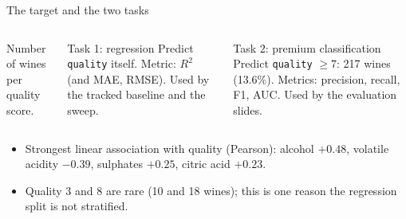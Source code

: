 \begin{frame}{The target and the two tasks}
\begin{columns}[T]
\centering
{}

{\scriptsize Number of wines per quality score.\par}
\begin{block}{Task 1: regression}
\footnotesize Predict \texttt{quality} itself. Metric: $R^2$ (and MAE, RMSE). Used by the tracked baseline and the sweep.
\end{block}
\begin{block}{Task 2: premium classification}
\footnotesize Predict \texttt{quality} $\ge 7$: 217 wines (13.6\%). Metrics: precision, recall, F1, AUC. Used by the evaluation slides.
\end{block}
\end{columns}
\vspace{0.3em}
\begin{itemize}\footnotesize
\item Strongest linear association with quality (Pearson): alcohol $+0.48$, volatile acidity $-0.39$, sulphates $+0.25$, citric acid $+0.23$.
\item Quality 3 and 8 are rare (10 and 18 wines); this is one reason the regression split is not stratified.
\end{itemize}
\coursefooter
\end{frame}

